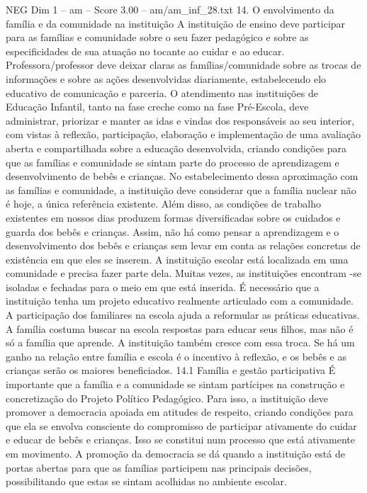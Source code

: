 \begin{textsample}{NEG Dim 1 – am – Score 3.00 – am/am\_inf\_28.txt}  \label{ex:f1_neg_066}
14.
O envolvimento da família e da comunidade na instituição A instituição de ensino deve participar para as famílias e comunidade sobre o seu fazer pedagógico e sobre as especificidades de sua atuação no tocante ao cuidar e ao educar.
Professora/professor deve deixar claras as famílias/comunidade sobre as trocas de informações e sobre as ações desenvolvidas diariamente, estabelecendo elo educativo de comunicação e parceria.
O atendimento nas instituições de Educação Infantil, tanto na fase creche como na fase Pré-Escola, deve administrar, priorizar e manter as idas e vindas dos responsáveis ao seu interior, com vistas à reflexão, participação, elaboração e implementação de uma avaliação aberta e compartilhada sobre a educação desenvolvida, criando condições para que as famílias e comunidade se sintam parte do processo de aprendizagem e desenvolvimento de bebês e crianças.
No estabelecimento dessa aproximação com as famílias e comunidade, a instituição deve considerar que a família nuclear não é hoje, a única referência existente.
Além disso, as condições de trabalho existentes em nossos dias produzem formas diversificadas sobre os cuidados e guarda dos bebês e crianças.
Assim, não há como pensar a aprendizagem e o desenvolvimento dos bebês e crianças sem levar em conta as relações concretas de existência em que eles se inserem.
A instituição escolar está localizada em uma comunidade e precisa fazer parte dela.
Muitas vezes, as instituições encontram -se isoladas e fechadas para o meio em que está inserida.
É necessário que a instituição tenha um projeto educativo realmente articulado com a comunidade.
A participação dos familiares na escola ajuda a reformular as práticas educativas.
A família costuma buscar na escola respostas para educar seus filhos, mas não é só a família que aprende.
A instituição também cresce com essa troca.
Se há um ganho na relação entre família e escola é o incentivo à reflexão, e os bebês e as crianças serão os maiores beneficiados. 14.1 Família e gestão participativa É importante que a família e a comunidade se sintam partícipes na construção e concretização do Projeto Político Pedagógico.
Para isso, a instituição deve promover a democracia apoiada em atitudes de respeito, criando condições para que ela se envolva consciente do compromisso de participar ativamente do cuidar e educar de bebês e crianças.
Isso se constitui num processo que está ativamente em movimento.
A promoção da democracia se dá quando a instituição está de portas abertas para que as famílias participem nas principais decisões, possibilitando que estas se sintam acolhidas no ambiente escolar.

\end{textsample}
